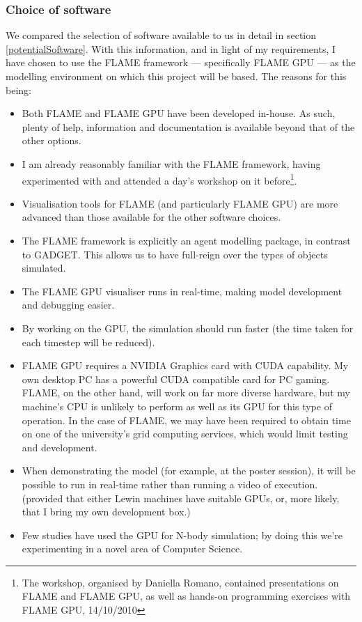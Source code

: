 \documentclass[11pt,a4paper]{article}
\begin{document}
\subsubsection{Choice of software}
We compared the selection of software available to us in detail in section \ref{potentialSoftware}. With this information, and in light of my requirements, I have chosen to use the FLAME framework --- specifically FLAME GPU --- as the modelling environment on which this project will be based. The reasons for this being:
\begin{itemize}
\item Both FLAME and FLAME GPU have been developed in-house. As such, plenty of help, information and documentation is available beyond that of the other options.
\item I am already reasonably familiar with the FLAME framework, having experimented with and attended a day's workshop on it before\footnote{The workshop, organised by Daniella Romano, contained presentations on FLAME and FLAME GPU, as well as hands-on programming exercises with FLAME GPU, 14/10/2010}.
\item Visualisation tools for FLAME (and particularly FLAME GPU) are more advanced than those available for the other software choices.
\item The FLAME framework is explicitly an agent modelling package, in contrast to GADGET. This allows us to have full-reign over the types of objects simulated.
\item The FLAME GPU visualiser runs in real-time, making model development and debugging easier.
\item By working on the GPU, the simulation should run faster (the time taken for each timestep will be reduced).
\item FLAME GPU requires a NVIDIA Graphics card with CUDA capability. My own desktop PC has a powerful CUDA compatible card for PC gaming. FLAME, on the other hand, will work on far more diverse hardware, but my machine's CPU is unlikely to perform as well as its GPU for this type of operation. In the case of FLAME, we may have been required to obtain time on one of the university's grid computing services, which would limit testing and development.
\item When demonstrating the model (for example, at the poster session), it will be possible to run in real-time rather than running a video of execution. (provided that either Lewin machines have suitable GPUs, or, more likely, that I bring my own development box.)
\item Few studies have used the GPU for N-body simulation; by doing this we're experimenting in a novel area of Computer Science.
\end{itemize}
\end{document}
